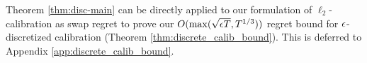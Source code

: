 \documentclass[final,12pt]{alt2025}
\begin{document}
Theorem \ref{thm:disc-main} can be directly applied to our formulation of $\ell_2$-calibration as swap regret to prove our $O(\max(\sqrt{\epsilon T}, T^{1/3}))$ regret bound for $\epsilon$-discretized calibration (Theorem \ref{thm:discrete_calib_bound}). This is deferred to Appendix \ref{app:discrete_calib_bound}.






  









\appendix


\end{document}
